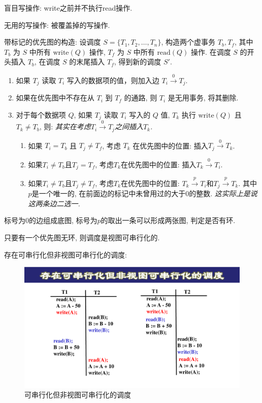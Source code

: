 盲目写操作: write之前并不执行read操作.

无用的写操作: 被覆盖掉的写操作.

带标记的优先图的构造:
设调度 $ S = \{ T_1, T_2, \ldots, T_n \} $, 构造两个虚事务 $ T_b, T_f $, 
其中 $ T_b $ 为 $ S $ 中所有 $ \text{write}(Q) $ 操作, 
$ T_f $ 为 $ S $ 中所有 $ \text{read}(Q) $ 操作. 
在调度 $ S $ 的开头插入 $ T_b $, 在调度 $ S $ 的末尾插入 $ T_f $, 得到新的调度 $ S' $.
\begin{enumerate}
    \item 如果 $ T_j $ 读取 $ T_i $ 写入的数据项的值，则加入边 $ T_i \overset{0}{\to} T_j $.
    \item 如果在优先图中不存在从 $ T_i $ 到 $ T_f $ 的通路, 则 $ T_i $ 是无用事务, 将其删除.
    \item 对于每个数据项 $ Q $, 如果 $ T_j $ 读取 $ T_i $ 写入的 $ Q $ 值, $ T_k $ 执行 $ \text{write}(Q) $ 且 $ T_k \neq T_b $, 则: \textit{其实在考虑$T_i \overset{0}{\to} T_j$之间插入$T_k$.}
    \begin{enumerate}
        \item 如果 $ T_i = T_b $ 且 $ T_j \neq T_f $, 考虑 $ T_k $ 在优先图中的位置: 插入$T_j\overset{0}{\to}T_k$.
        \item 如果$T_i\neq T_b$且$T_j=T_f$, 考虑$T_k$在优先图中的位置: 插入$T_k\overset{0}{\to} T_i$.
        \item 如果$T_i\neq T_b$且$T_j\neq T_f$, 考虑$T_k$在优先图中的位置: $T_k\overset{p}{\to} T_i$和$T_j\overset{p}{\to} T_k$. 其中$p$是一个唯一的, 在前面边的标记中未曾用过的大于0的整数.
        \textit{这实际上是说这两条边二选一.}
    \end{enumerate}
\end{enumerate}
标号为0的边组成底图, 标号为$p$的取出一条可以形成两张图, 判定是否有环.

\begin{theorem}[视图可串行化判定准则]
  只要有一个优先图无环, 则调度是视图可串行化的.
\end{theorem}

存在可串行化但非视图可串行化的调度:
\begin{figure}[H]
    \centering
    \includegraphics[width=.7\textwidth]{./figure/可串行化.pdf}
    \caption{可串行化但非视图可串行化的调度}
\end{figure}

